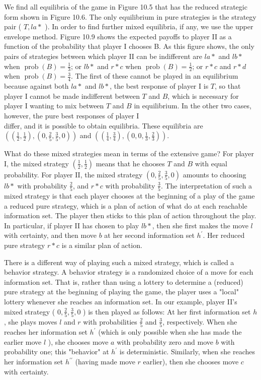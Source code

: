 \documentclass[12pt]{article}
\begin{document}
We find all equilibria of the game in Figure 10.5 that has the reduced strategic form shown in Figure 10.6. The only equilibrium in pure strategies is the strategy pair ( $T, l a *$ ). In order to find further mixed equilibria, if any, we use the upper envelope method. Figure 10.9 shows the expected payoffs to player II as a function of the probability that player I chooses B. As this figure shows, the only pairs of strategies between which player II can be indifferent are $l a *$ and $l b *$ when $\operatorname{prob}(B)=\frac{1}{3}$; or $l b *$ and $r * c$ when $\operatorname{prob}(B)=\frac{1}{2}$; or $r * c$ and $r * d$ when $\operatorname{prob}(B)=\frac{3}{4}$. The first of these cannot be played in an equilibrium because against both $l a *$ and $l b *$, the best response of player I is $T$, so that player I cannot be made indifferent between $T$ and $B$, which is necessary for player I wanting to mix between $T$ and $B$ in equilibrium. In the other two cases, however, the pure best responses of player I\\
differ, and it is possible to obtain equilibria. These equilibria are $\left(\left(\frac{1}{2}, \frac{1}{2}\right),\left(0, \frac{2}{5}, \frac{3}{5}, 0\right)\right)$ and $\left(\left(\frac{1}{4}, \frac{3}{4}\right),\left(0,0, \frac{1}{3}, \frac{2}{3}\right)\right)$.

What do these mixed strategies mean in terms of the extensive game? For player I, the mixed strategy $\left(\frac{1}{2}, \frac{1}{2}\right)$ means that he chooses $T$ and $B$ with equal probability. For player II, the mixed strategy $\left(0, \frac{2}{5}, \frac{3}{5}, 0\right)$ amounts to choosing $l b *$ with probability $\frac{2}{5}$, and $r * c$ with probability $\frac{3}{5}$. The interpretation of such a mixed strategy is that each player chooses at the beginning of a play of the game a reduced pure strategy, which is a plan of action of what do at each reachable information set. The player then sticks to this plan of action throughout the play. In particular, if player II has chosen to play $l b *$, then she first makes the move $l$ with certainty, and then move $b$ at her second information set $h^{\prime}$. Her reduced pure strategy $r * c$ is a similar plan of action.

There is a different way of playing such a mixed strategy, which is called a behavior strategy. A behavior strategy is a randomized choice of a move for each information set. That is, rather than using a lottery to determine a (reduced) pure strategy at the beginning of playing the game, the player uses a "local" lottery whenever she reaches an information set. In our example, player II's mixed strategy ( $0, \frac{2}{5}, \frac{3}{5}, 0$ ) is then played as follows: At her first information set $h$, she plays moves $l$ and $r$ with probabilities $\frac{2}{5}$ and $\frac{3}{5}$, respectively. When she reaches her information set $h^{\prime}$ (which is only possible when she has made the earlier move $l$ ), she chooses move $a$ with probability zero and move $b$ with probability one; this "behavior" at $h^{\prime}$ is deterministic. Similarly, when she reaches her information set $h^{\prime \prime}$ (having made move $r$ earlier), then she chooses move $c$ with certainty.
\end{document}

